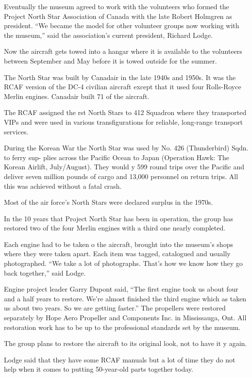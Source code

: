 Eventually the museum agreed to work with the volunteers who formed
the Project North Star Association of Canada with the late Robert
Holmgren as president. “We became the model for other volunteer groups
now working with the museum,” said the association’s current
president, Richard Lodge.

Now the aircraft gets towed into a hangar where it is available to the
volunteers between September and May before it is towed outside for
the summer.

The North Star was built by Canadair in the late 1940s and 1950s. It
was the RCAF version of the DC-4 civilian aircraft except that it used
four Rolls-Royce Merlin engines. Canadair built 71 of the aircraft.

The RCAF assigned the rst North Stars to 412 Squadron where they
transported VIPs and were used in various transfigurations for
reliable, long-range transport services.

During the Korean War the North Star was used by No. 426 (Thunderbird)
Sqdn. to ferry sup- plies across the Pacific Ocean to Japan (Operation
Hawk: The Korean Airlift, July/August). They would y 599 round trips
over the Pacific and deliver seven million pounds of cargo and 13,000
personnel on return trips. All this was achieved without a fatal
crash.

Most of the air force’s North Stars were declared surplus in the
1970s.

In the 10 years that Project North Star has been in operation, the
group has restored two of the four Merlin engines with a third one
nearly completed.

Each engine had to be taken o the aircraft, brought into the museum’s
shops where they were taken apart. Each item was tagged, catalogued 
and usually photographed. “We take a lot of photographs. That’s
how we know how they go back together,” said Lodge.

Engine project leader Garry Dupont said, “The first engine took us about
four and a half years to restore. We’re almost finished the third engine
which as taken us about two years. So we are getting faster.” The
propellers were restored separately by Hope Aero Propeller and
Components Inc. in Mississauga, Ont. All restoration work has to be up
to the professional standards set by the museum.

The group plans to restore the aircraft to its original look, not to
have it y again.

Lodge said that they have some RCAF manuals but a lot of time they do
not help when it comes to putting 50-year-old parts together today.

